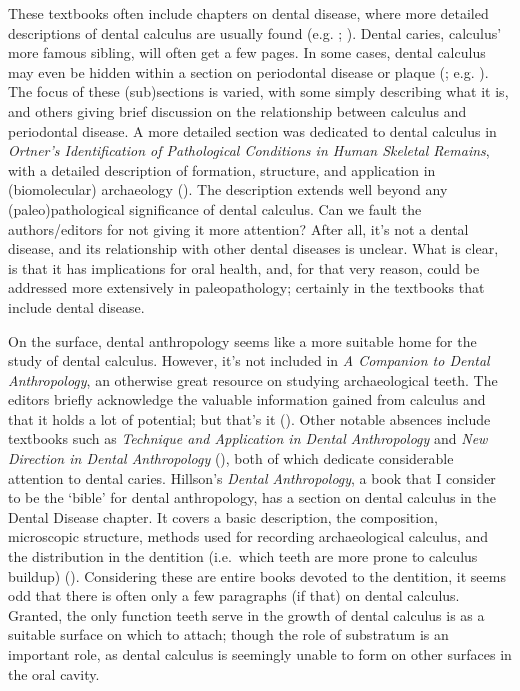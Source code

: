 \documentclass[
  b5paper,
]{book}
\begin{document}
These textbooks often include chapters on dental disease, where more
detailed descriptions of dental calculus are usually found (e.g.
;
). Dental
caries, calculus' more famous sibling, will often get a few pages. In
some cases, dental calculus may even be hidden within a section on
periodontal disease or plaque
(;
e.g. ).
The focus of these (sub)sections is varied, with some simply describing
what it is, and others giving brief discussion on the relationship
between calculus and periodontal disease. A more detailed section was
dedicated to dental calculus in \emph{Ortner's Identification of
Pathological Conditions in Human Skeletal Remains}, with a detailed
description of formation, structure, and application in (biomolecular)
archaeology (). The description extends well beyond any (paleo)pathological
significance of dental calculus. Can we fault the authors/editors for
not giving it more attention? After all, it's not a dental disease, and
its relationship with other dental diseases is unclear. What is clear,
is that it has implications for oral health, and, for that very reason,
could be addressed more extensively in paleopathology; certainly in the
textbooks that include dental disease.

On the surface, dental anthropology seems like a more suitable home for
the study of dental calculus. However, it's not included in \emph{A
Companion to Dental Anthropology}, an otherwise great resource on
studying archaeological teeth. The editors briefly acknowledge the
valuable information gained from calculus and that it holds a lot of
potential; but that's it (). Other notable absences include textbooks such as \emph{Technique
and Application in Dental Anthropology} and \emph{New Direction in
Dental Anthropology}
(),
both of which dedicate considerable attention to dental caries.
Hillson's \emph{Dental Anthropology}, a book that I consider to be the
`bible' for dental anthropology, has a section on dental calculus in the
Dental Disease chapter. It covers a basic description, the composition,
microscopic structure, methods used for recording archaeological
calculus, and the distribution in the dentition (i.e.~which teeth are
more prone to calculus buildup)
().
Considering these are entire books devoted to the dentition, it seems
odd that there is often only a few paragraphs (if that) on dental
calculus. Granted, the only function teeth serve in the growth of dental
calculus is as a suitable surface on which to attach; though the role of
substratum is an important role, as dental calculus is seemingly unable
to form on other surfaces in the oral cavity.
\end{document}
